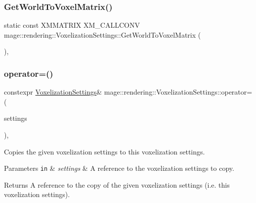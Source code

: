 \subsubsection{\texorpdfstring{Get\+World\+To\+Voxel\+Matrix()}{GetWorldToVoxelMatrix()}}
{\footnotesize\ttfamily static const X\+M\+M\+A\+T\+R\+IX X\+M\+\_\+\+C\+A\+L\+L\+C\+O\+NV mage\+::rendering\+::\+Voxelization\+Settings\+::\+Get\+World\+To\+Voxel\+Matrix (\begin{DoxyParamCaption}{ }\end{DoxyParamCaption})\hspace{0.3cm}{\ttfamily [static]}, {\ttfamily [noexcept]}}

\hypertarget{classmage_1_1rendering_1_1_voxelization_settings_ae21513856299e74c147c5d347b36961a}{}\label{classmage_1_1rendering_1_1_voxelization_settings_ae21513856299e74c147c5d347b36961a} 
\subsubsection{\texorpdfstring{operator=()}{operator=()}\hspace{0.1cm}{\footnotesize\ttfamily [1/2]}}
{\footnotesize\ttfamily constexpr \hyperlink{classmage_1_1rendering_1_1_voxelization_settings}{Voxelization\+Settings}\& mage\+::rendering\+::\+Voxelization\+Settings\+::operator= (\begin{DoxyParamCaption}\item[{const \hyperlink{classmage_1_1rendering_1_1_voxelization_settings}{Voxelization\+Settings} \&}]{settings }\end{DoxyParamCaption})\hspace{0.3cm}{\ttfamily [default]}, {\ttfamily [noexcept]}}

Copies the given voxelization settings to this voxelization settings.


\begin{DoxyParams}[1]{Parameters}
\mbox{\tt in}  & {\em settings} & A reference to the voxelization settings to copy. \\
\hline
\end{DoxyParams}
\begin{DoxyReturn}{Returns}
A reference to the copy of the given voxelization settings (i.\+e. this voxelization settings). 
\end{DoxyReturn}
\hypertarget{classmage_1_1rendering_1_1_voxelization_settings_a96ea5fa3e2a8bdab0b4835caa11bd13f}{}\label{classmage_1_1rendering_1_1_voxelization_settings_a96ea5fa3e2a8bdab0b4835caa11bd13f} 

